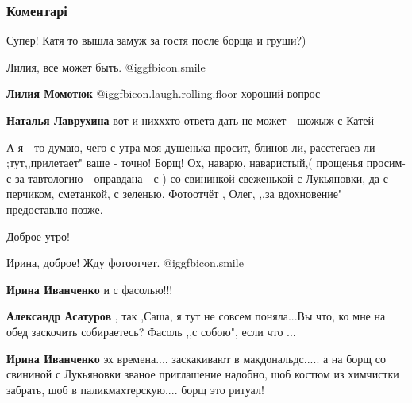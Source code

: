  
 
 
 
 
\subsubsection{Коментарі}

\begin{itemize} %
Супер! Катя то вышла замуж за гостя после борща и груши?)

\begin{itemize} %
Лилия, все может быть.  @igg{fbicon.smile} 

\textbf{Лилия Момотюк}  @igg{fbicon.laugh.rolling.floor} хороший вопрос

\textbf{Наталья Лаврухина} вот и нихххто ответа дать не может - шожыж с Катей
\end{itemize} %


А я - то думаю, чего с утра моя душенька просит, блинов ли, расстегаев ли
;тут,,прилетает" ваше - точно! Борщ! Ох, наварю, наваристый,( прощенья просим-
с за тавтологию - оправдана - с ) со свининкой свеженькой с Лукьяновки, да с
перчиком, сметанкой, с зеленью. Фотоотчёт , Олег, ,,за вдохновение" предоставлю
позже.

Доброе утро!

\begin{itemize} %
Ирина, доброе! Жду фотоотчет.  @igg{fbicon.smile} 

\textbf{Ирина Иванченко} и с фасолью!!!

\begin{itemize} %
\textbf{Александр Асатуров} , так ,Саша, я тут не совсем поняла...Вы что, ко мне на обед заскочить собираетесь? Фасоль ,,с собою", если что ...

\textbf{Ирина Иванченко} эх времена.... заскакивают в макдональдс..... а на борщ со свининой с Лукьяновки званое приглашение надобно, шоб костюм из химчистки забрать, шоб в паликмахтерскую.... борщ это ритуал!


\end{itemize}
\end{itemize}
\end{itemize}
